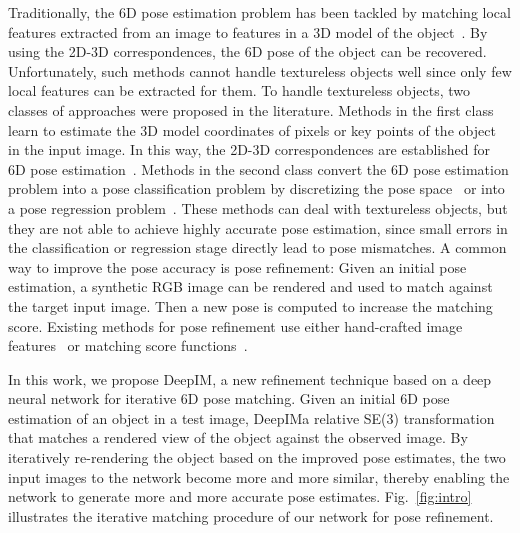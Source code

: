 \documentclass[twocolumn]{svjour3}
\newcommand{\dimnet}[0]{DeepIM}
\begin{document}
Traditionally, the 6D pose estimation problem has been tackled by matching local features extracted from an image to features in a 3D model of the object~\citep{lowe1999object,rothganger20063d,collet2011moped}. By using the 2D-3D correspondences, the 6D pose of the object can be recovered. Unfortunately, such methods cannot handle textureless objects well since only few local features can be extracted for them. To handle textureless objects, two classes of approaches were proposed in the literature. Methods in the first class learn to estimate the 3D model coordinates of pixels or key points of the object in the input image. In this way, the 2D-3D correspondences are established for 6D pose estimation~\citep{Brachmann2014Learning6O,rad2017bb8,tekin2017real}. Methods in the second class convert the 6D pose estimation problem into a pose classification problem by discretizing the pose space~\citep{hinterstoisser2012accv} or into a pose regression problem~\citep{xiang2017posecnn}. These methods can deal with textureless objects, but they are not able to achieve highly accurate pose estimation, since small errors in the classification or regression stage directly lead to pose mismatches. A common way to improve the pose accuracy is pose refinement: Given an initial pose estimation, a synthetic RGB image can be rendered and used to match against the target input image. Then a new pose is computed to increase the matching score. Existing methods for pose refinement use either hand-crafted image features~\citep{tjaden2017real} or matching score functions~\citep{rad2017bb8}. 

In this work, we propose \dimnet, a new refinement technique based on a deep neural network for iterative 6D pose matching. Given an initial 6D pose estimation of an object in a test image, \dimnet\predicts a relative SE(3) transformation that matches a rendered view of the object against the observed image. By iteratively re-rendering the object based on the improved pose estimates, the two input images to the network become more and more similar, thereby enabling the network to generate more and more accurate pose estimates. Fig.~\ref{fig:intro} illustrates the iterative matching procedure of our network for pose refinement.
\end{document}
